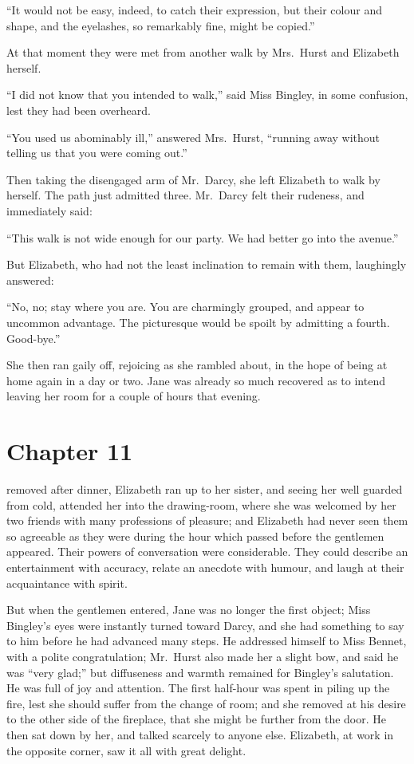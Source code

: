 ``It would not be easy, indeed, to catch their expression, but their
colour and shape, and the eyelashes, so remarkably fine, might
be copied.''

At that moment they were met from another walk by Mrs.\ Hurst
and Elizabeth herself.

``I did not know that you intended to walk,'' said Miss Bingley,
in some confusion, lest they had been overheard.

``You used us abominably ill,'' answered Mrs.\ Hurst, ``running
away without telling us that you were coming out.''

Then taking the disengaged arm of Mr.\ Darcy, she left Elizabeth
to walk by herself.  The path just admitted three.  Mr.\ Darcy felt
their rudeness, and immediately said:

``This walk is not wide enough for our party.  We had better go
into the avenue.''

But Elizabeth, who had not the least inclination to remain with
them, laughingly answered:

``No, no; stay where you are.  You are charmingly grouped, and
appear to uncommon advantage.  The picturesque would be
spoilt by admitting a fourth.  Good-bye.''

She then ran gaily off, rejoicing as she rambled about, in the
hope of being at home again in a day or two.  Jane was already
so much recovered as to intend leaving her room for a couple of
hours that evening.



\chapter{Chapter 11}


 removed after dinner, Elizabeth ran up to her
sister, and seeing her well guarded from cold, attended her into
the drawing-room, where she was welcomed by her two friends
with many professions of pleasure; and Elizabeth had never seen
them so agreeable as they were during the hour which passed
before the gentlemen appeared.  Their powers of conversation
were considerable.  They could describe an entertainment with
accuracy, relate an anecdote with humour, and laugh at their
acquaintance with spirit.

But when the gentlemen entered, Jane was no longer the first
object; Miss Bingley's eyes were instantly turned toward Darcy,
and she had something to say to him before he had advanced
many steps.  He addressed himself to Miss Bennet, with a polite
congratulation; Mr.\ Hurst also made her a slight bow, and said
he was ``very glad;'' but diffuseness and warmth remained for
Bingley's salutation.  He was full of joy and attention.  The first
half-hour was spent in piling up the fire, lest she should suffer
from the change of room; and she removed at his desire to the
other side of the fireplace, that she might be further from the
door.  He then sat down by her, and talked scarcely to anyone
else.  Elizabeth, at work in the opposite corner, saw it all with
great delight.

